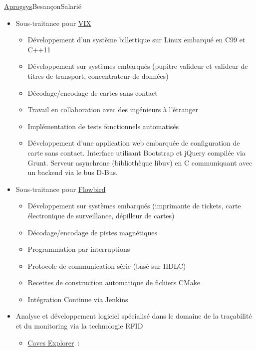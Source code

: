 \documentclass[11pt,a4paper,sans,french]{moderncv}
\begin{document}
{\href{https://www.aprogsys.com/}{Aprogsys}}{Besançon}{Salarié}{%
 \begin{itemize}
  \item Sous-traitance pour \href{http://vixtechnology.com/}{VIX}
        \begin{itemize}
         \item Développement d'un système billettique sur Linux embarqué
               en C99 et C++11
         \item Développement sur systèmes embarqués (pupitre valideur et
               valideur de titres de transport, concentrateur de données)
         \item Décodage/encodage de cartes sans contact
         \item Travail en collaboration avec des ingénieurs à l'étranger
         \item Implémentation de tests fonctionnels automatisés
         \item Développement d'une application web embarquée de configuration
               de carte sans contact.
               Interface utilisant Bootstrap et jQuery compilée via Grunt.
               Serveur asynchrone (bibliothèque libuv) en C communiquant avec
               un backend via le bus D-Bus.
        \end{itemize}
  \item Sous-traitance pour \href{http://flowbird.group/}{Flowbird}
        \begin{itemize}
         \item Développement sur systèmes embarqués (imprimante de tickets,
               carte électronique de surveillance, dépilleur de cartes)
         \item Décodage/encodage de pistes magnétiques
         \item Programmation par interruptions
         \item Protocole de communication série (basé sur HDLC)
         \item Recettes de construction automatique de fichiers CMake
         \item Intégration Continue via Jenkins
        \end{itemize}
  \item Analyse et développement logiciel spécialisé dans le domaine
        de la traçabilité et du monitoring via la technologie RFID
        \begin{itemize}
         \item \href{http://www.caves-explorer.com/}{Caves Explorer}~:

\end{itemize}
\end{itemize}}
\end{document}
